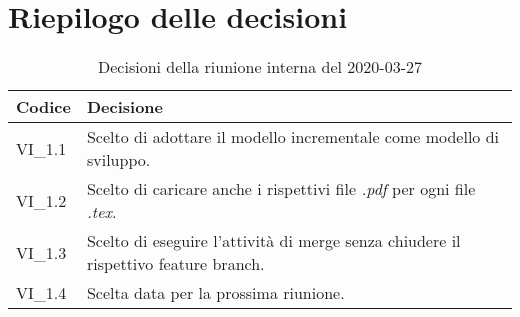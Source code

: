 \section{Riepilogo delle decisioni}
\begin{longtable}{ 
	 >{\centering}p{} >{}p{} }
	
	\caption{Decisioni della riunione interna del 2020-03-27}\\	
	
	\textbf{\color{white}Codice} & 
	\textbf{\color{white}Decisione} 
	\tabularnewline  
	\endhead
	
	VI\_1.1 & Scelto di adottare il modello incrementale come modello di sviluppo. \\
	VI\_1.2 & Scelto di caricare anche i rispettivi file \textit{.pdf} per ogni file \textit{.tex}. \\
	VI\_1.3 & Scelto di eseguire l'attività di merge senza chiudere il rispettivo feature branch. \\
	VI\_1.4 & Scelta data per la prossima riunione. \\
	
\end{longtable}